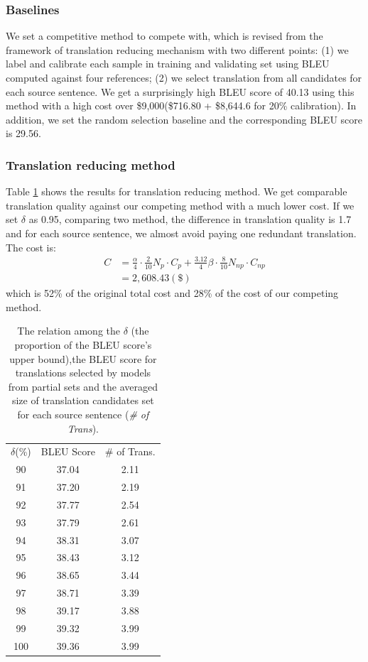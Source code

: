 \documentclass[11pt,letterpaper]{article}
\begin{document}
\subsubsection{Baselines} We set a competitive method to compete with, which is revised from the framework of translation reducing mechanism with two different points: (1) we label and calibrate each sample in training and validating set using BLEU computed against four references; (2) we select translation from all candidates for each source sentence. We get a surprisingly high BLEU score of 40.13 using this method with a high cost over \$9,000(\$716.80 + \$8,644.6 for 20\% calibration). In addition, we set the random selection baseline and the corresponding BLEU score is 29.56.

\subsubsection{Translation reducing method} Table \ref{orderanother} shows the results for translation reducing method. We get comparable translation quality against our competing method with a much lower cost. If we set $\delta$ as 0.95, comparing two method, the difference in translation quality is 1.7 and for each source sentence, we almost avoid paying one redundant translation. The cost is:
 \begin{align*}
  C& = \frac{\alpha}{4} \cdot \frac{2}{10} N_{p}\cdot C_{p}  + \frac{3.12}{4} \beta\cdot \frac{8}{10} N_{np} \cdot C_{np}\\
   & = 2,608.43 (\$)
 \end{align*}
 which is 52\% of the original total cost and  28\% of the cost of our competing method.
 \begin{table}[h]
 \center
\begin{tabular}{c|c|c}
\hline
$\delta$(\%) & BLEU Score & \# of Trans. \\ \hhline{===}
90    & 37.04      & 2.11             \\
91    & 37.20      & 2.19             \\
92    & 37.77      & 2.54             \\
93    & 37.79      & 2.61             \\
94    & 38.31      & 3.07             \\
95    & 38.43      & 3.12             \\
96    & 38.65      & 3.44             \\
97    & 38.71      & 3.39             \\
98    & 39.17      & 3.88             \\
99    & 39.32      & 3.99             \\
100   & 39.36      & 3.99             \\ \hline
\end{tabular}
\caption{The relation among the $\delta$ (the proportion of the BLEU score's upper bound),the BLEU score for translations selected by models from partial sets and the averaged size of translation candidates set for each source sentence (\textit{\# of Trans}).  }
    \label{orderanother}
\end{table}
\end{document}
